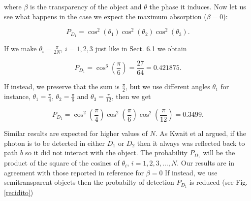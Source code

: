 \documentclass[12pt]{book}
\begin{document}
where $\beta$ is the transparency of the object and $\theta$ the phase it induces. Now let us see what happens in the case we expect the maximum absorption ($\beta=0$): 

\begin{equation}
P_{D_{1}}=\cos^{2}{\left(\theta_{1} \right)} \cos^{2}{\left(\theta_{2} \right)} \cos^{2}{\left(\theta_{3} \right)}.
\end{equation}

If we make $\theta_{i}=\frac{\pi}{2N}$, $i=1, 2, 3$ just like in Sect. 6.1 we obtain

\begin{equation}
P_{D_{1}}=\cos^{6}{\left(\frac{\pi}{6} \right)}=\frac{27}{64}=0.421875.
\end{equation} 

If instead, we preserve that the sum is $\frac{\pi}{2}$,  but we use different angles $\theta_{1}$ for instance, $\theta_{1}=\frac{\pi}{4}$, $\theta_{2}=\frac{\pi}{6}$ and $\theta_{3}=\frac{\pi}{12}$, then we get 

\begin{equation}
P_{D_{1}}=\cos^{2}{\left(\frac{\pi}{4} \right)} \cos^{2}{\left(\frac{\pi}{6} \right)} \cos^{2}{\left(\frac{\pi}{12} \right)}=0.3499.
\end{equation}

Similar results are expected for higher values of $N$. As Kwait et al \cite{exp} argued, if the photon is to be detected in either $D_{1}$ or $D_{2}$ then it always was reflected back to path $b$ so it did not interact with the object. The probability $P_{D_{1}}$ will be the product of the square of the cosines of $\theta_{i}$, $i=1,2,3,\dots,N$. Our results are in agreement with those reported in reference \cite{exp} for $\beta=0$ If instead, we use semitransparent objects then the probabilty of detection $P_{D_{1}}$ is reduced (see Fig. \ref{recidito})
\end{document}

